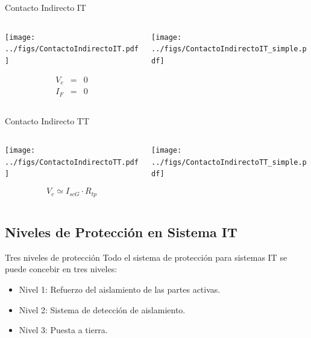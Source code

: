 \documentclass[aspectratio=169, usenames,svgnames,dvipsnames]{beamer}
\begin{document}
\begin{frame}[label={sec:org4647a30}]{Contacto Indirecto IT}
\begin{columns}
\begin{column}{0.5\columnwidth}
\begin{center}
\texttt{[image: ../figs/ContactoIndirectoIT.pdf]}
\end{center}

$$\begin{aligned}
V_{c} & = & 0\\
I_{F} & = & 0\end{aligned}$$
\end{column}

\begin{column}{0.5\columnwidth}
\begin{center}
\texttt{[image: ../figs/ContactoIndirectoIT\_simple.pdf]}
\end{center}
\end{column}
\end{columns}
\end{frame}


\begin{frame}[label={sec:org5362d20}]{Contacto Indirecto TT}
\begin{columns}
\begin{column}{0.5\columnwidth}
\begin{center}
\texttt{[image: ../figs/ContactoIndirectoTT.pdf]}
\end{center}
$$V_{c}\simeq I_{scG}\cdot R_{tp}$$
\end{column}

\begin{column}{0.5\columnwidth}
\begin{center}
\texttt{[image: ../figs/ContactoIndirectoTT\_simple.pdf]}
\end{center}
\end{column}
\end{columns}
\end{frame}


\subsection{Niveles de Protección en Sistema IT}
\label{sec:org6ceba8b}


\begin{frame}[label={sec:org0e5ff24}]{Tres niveles de protección}
Todo el sistema de protección para sistemas IT se puede concebir en tres
niveles:

\begin{itemize}
\item Nivel 1: Refuerzo del aislamiento de las partes activas.

\item Nivel 2: Sistema de detección de aislamiento.

\item Nivel 3: Puesta a tierra.
\end{itemize}
\end{frame}
\end{document}
